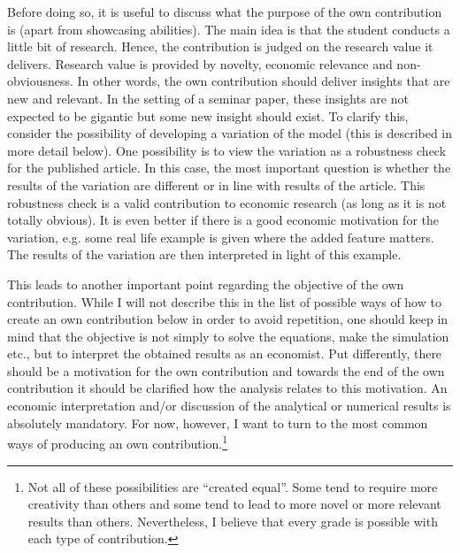 \documentclass[a4paper,11pt]{article}
\begin{document}
Before doing so, it is useful to discuss what the purpose of the own contribution is (apart from showcasing abilities). The main idea is that the student conducts a little bit of research. Hence, the contribution is judged on the research value it delivers. Research value is provided by novelty, economic relevance and non-obviousness. In other words, the own contribution should deliver insights that are new and relevant. In the setting of a seminar paper, these insights are not expected to be gigantic but some new insight should exist. To clarify this, consider the possibility of developing a variation of the model (this is described in more detail below). One possibility is to view the variation as a robustness check for the published article. In this case, the most important question is whether the results of the variation are different or in line with results of the article. This robustness check is a valid contribution to economic research (as long as it is not totally obvious). It is even better if there is a good economic motivation for the variation, e.g. some real life example is given where the added feature matters. The results of the variation are then interpreted in light of this example.

This leads to another important point regarding the objective of the own contribution. While I will not describe this in the list of possible ways of how to create an own contribution below in order to avoid repetition, one should keep in mind that the objective is not simply to solve the equations, make the simulation etc., but to interpret the obtained results as an economist. Put differently, there should be a motivation for the own contribution and towards the end of the own contribution it should be clarified how the analysis relates to this motivation. An economic interpretation and/or discussion of the analytical or numerical results is absolutely mandatory. For now, however, I want to turn to the most common ways of producing an own contribution.\footnote{Not all of these possibilities are ``created equal''. Some tend to require more creativity than others and some tend to lead to more novel or more relevant results than others. Nevertheless, I believe that every grade is possible with each type of contribution.}
\end{document}
